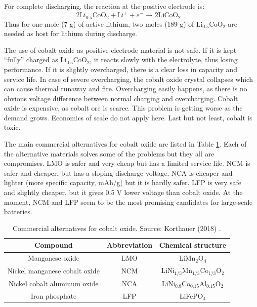 For complete discharging, the reaction at the positive electrode is:
\begin{equation}
    \label{eq:positive-electrode}
    2\text{Li}_{0.5}\text{CoO}_2 + \text{Li}^+ + e^- \rightarrow 2\text{LiCoO}_2
\end{equation}
Thus for one mole (7 g) of active lithium, two moles (189 g) of Li$_{0.5}$CoO$_2$ are needed as host for lithium during discharge.

The use of cobalt oxide as positive electrode material is not safe. If it is kept “fully” charged as Li$_{0.5}$CoO$_2$, it reacts slowly with the electrolyte, thus losing performance. If it is slightly overcharged, there is a clear loss in capacity and service life. In case of severe overcharging, the cobalt oxide crystal collapses which can cause thermal runaway and fire. Overcharging easily happens, as there is no obvious voltage difference between normal charging and overcharging. Cobalt oxide is expensive, as cobalt ore is scarce. This problem is getting worse as the demand grows. Economics of scale do not apply here. Last but not least, cobalt is toxic.

The main commercial alternatives for cobalt oxide are listed in Table \ref{table:cathode-alternatives}. Each of the alternative materials solves some of the problems but they all are compromises. LMO is safer and very cheap but has a limited service life. NCM is safer and cheaper, but has a sloping discharge voltage. NCA is cheaper and lighter (more specific capacity, mAh/g) but it is hardly safer. LFP is very safe and slightly cheaper, but it gives 0.5 V lower voltage than cobalt oxide. At the moment, NCM and LFP seem to be the most promising candidates for large-scale batteries.

\begin{table}[H]
    \centering 
        \begin{tabular}{|c c c|}
        \hline
        \rowcolor{bluepoli!40}
        \textbf{Compound} & \textbf{Abbreviation} & \textbf{Chemical structure} \T\B \\
        \hline \hline
        Manganese oxide & LMO & LiMn$_2$O$_4$\T\B\\
        \hline
        Nickel manganese cobalt oxide & NCM & LiNi$_{1/3}$Mn$_{1/3}$Co$_{1/3}$O$_2$\T\B\\
        \hline
        Nickel cobalt aluminum oxide & NCA & LiNi$_{0.8}$Co$_{0.15}$Al$_{0.15}$O$_2$\T\B\\
        \hline
        Iron phosphate & LFP & LiFePO$_4$\T\B\\
        \hline
        \end{tabular}
        \\[10pt]
        \caption[Commercial alternatives for cobalt oxide]{Commercial alternatives for cobalt oxide. Source: Korthauer (2018) \cite{korthauer2018lithium}.}
        \label{table:cathode-alternatives}
\end{table}

